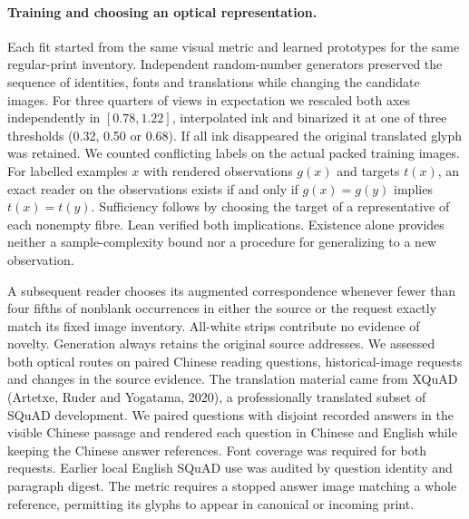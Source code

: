 \documentclass[12pt,a4paper]{article}
\providecommand{\DIFadd}[1]{{\protect\color{blue} \sf #1}} %
\begin{document}
\paragraph{\DIFadd{Training and choosing an optical representation.}}
\DIFadd{Each fit started from the same visual metric and learned prototypes for the same regular-print inventory. Independent random-number generators preserved the sequence of identities, fonts and translations while changing the candidate images. For three quarters of views in expectation we rescaled both axes independently in $[0.78,1.22]$, interpolated ink and binarized it at one of three thresholds (0.32, 0.50 or 0.68). If all ink disappeared the original translated glyph was retained. We counted conflicting labels on the actual packed training images. For labelled examples $x$ with rendered observations $g(x)$ and targets $t(x)$, an exact reader on the observations exists if and only if $g(x)=g(y)$ implies $t(x)=t(y)$. Sufficiency follows by choosing the target of a representative of each nonempty fibre. Lean verified both implications. Existence alone provides neither a sample-complexity bound nor a procedure for generalizing to a new observation.
}

\DIFadd{A subsequent reader chooses its augmented correspondence whenever fewer than four fifths of nonblank occurrences in either the source or the request exactly match its fixed image inventory. All-white strips contribute no evidence of novelty. Generation always retains the original source addresses. We assessed both optical routes on paired Chinese reading questions, historical-image requests and changes in the source evidence. The translation material came from XQuAD (Artetxe, Ruder and Yogatama, 2020), a professionally translated subset of SQuAD development. We paired questions with disjoint recorded answers in the visible Chinese passage and rendered each question in Chinese and English while keeping the Chinese answer references. Font coverage was required for both requests. Earlier local English SQuAD use was audited by question identity and paragraph digest. The metric requires a stopped answer image matching a whole reference, permitting its glyphs to appear in canonical or incoming print.
}
\end{document}

